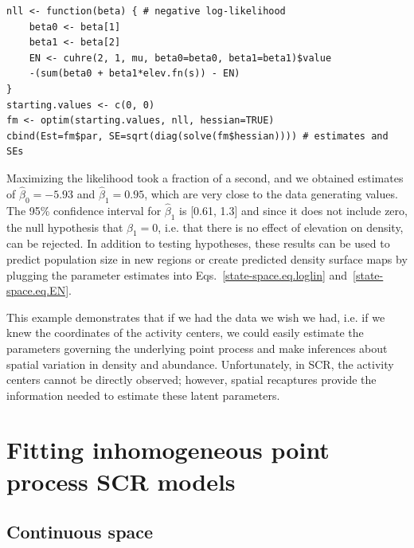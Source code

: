 \begin{small}
\begin{verbatim}
nll <- function(beta) { # negative log-likelihood
    beta0 <- beta[1]
    beta1 <- beta[2]
    EN <- cuhre(2, 1, mu, beta0=beta0, beta1=beta1)$value
    -(sum(beta0 + beta1*elev.fn(s)) - EN)
}
starting.values <- c(0, 0)
fm <- optim(starting.values, nll, hessian=TRUE)
cbind(Est=fm$par, SE=sqrt(diag(solve(fm$hessian)))) # estimates and SEs
\end{verbatim}
\end{small}

Maximizing the likelihood took a fraction of a second, and we
obtained estimates of $\hat{\beta}_0=-5.93$ and $\hat{\beta}_1=0.95$,
which are very close to the data generating values. The 95\% confidence
interval for $\hat{\beta}_1$ is [0.61, 1.3] and since it does not
include zero, the null hypothesis that $\beta_1=0$, i.e. that there is
no effect of elevation on density, can be rejected. In addition to testing
hypotheses, these results can be used to predict population size in
new regions or create predicted density surface maps by plugging the
parameter estimates into Eqs.~\ref{state-space.eq.loglin} and~\ref{state-space.eq.EN}.

This example demonstrates
that if we had the data we wish we had, i.e. if we knew the
coordinates of the activity centers, we could easily estimate the
parameters governing the underlying point process and make inferences
about spatial variation in density and abundance. Unfortunately, in
SCR, the activity centers cannot be directly observed; however,
spatial recaptures provide the information needed to
estimate these latent parameters.

\section{Fitting inhomogeneous point process SCR models}

\subsection{Continuous space}


